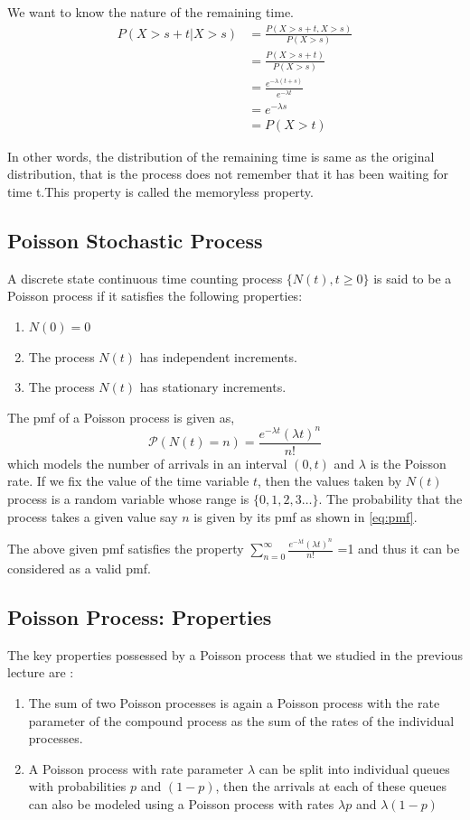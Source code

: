 We want to know the nature of the remaining time. 
\begin{align*}
    P(X>s+t|X>s)&=\frac{P(X>s+t,X>s)}{P(X>s)}\\
    &=\frac{P(X>s+t)}{P(X>s)}\\
    &=\frac{e^{-\lambda(t+s)}}{e^{-\lambda t}}\\
    &=e^{-\lambda s}\\
    &=P(X>t)
\end{align*}

In other words, the distribution of the remaining time  is same as the original distribution, that is the process does not remember that it has been waiting for time t.This property is called the memoryless property.

\subsection*{Poisson Stochastic Process}
A discrete state continuous time counting process $\{N(t),t \geq 0\}$ is said to be a Poisson process if it satisfies the following properties:
\begin{enumerate}
    \item $N(0)=0$
    \item The process $N(t)$ has independent increments.
      \item The process $N(t)$ has stationary increments.
\end{enumerate}
The pmf of a Poisson process is given as,
\begin{equation}
    \mathcal{P}(N(t)=n)=\frac{e^{-\lambda t}{(\lambda t)}^n}{n!}
    \label{eq:pmf}
\end{equation}
which models the number of arrivals in an interval $(0,t)$ and $\lambda$ is the Poisson rate. If we fix the value of the time variable $t$, then the values taken by $N(t)$ process is a random variable whose range is $\{0,1,2,3\dots\}$. The probability that the process takes a given value say $n$ is given by its pmf as shown in \eqref{eq:pmf}. 

The above given pmf satisfies the property $\sum_{n=0}^\infty \frac{e^{-\lambda t}{(\lambda t)}^n}{n!}$ =1 and thus it can be considered as a valid pmf.
\subsection*{Poisson Process: Properties}
The key properties possessed by a Poisson process that we studied in the previous lecture are :
\begin{enumerate}
    \item The sum of two Poisson processes is again a Poisson process with the rate parameter of the compound process as the sum of the rates of the individual processes.
    \item A Poisson process with rate parameter $\lambda$ can be split into individual queues with probabilities $p$ and $(1-p)$, then the arrivals at each of these queues can also be modeled using a Poisson process with rates $\lambda p$ and $\lambda(1-p)$
\end{enumerate}


